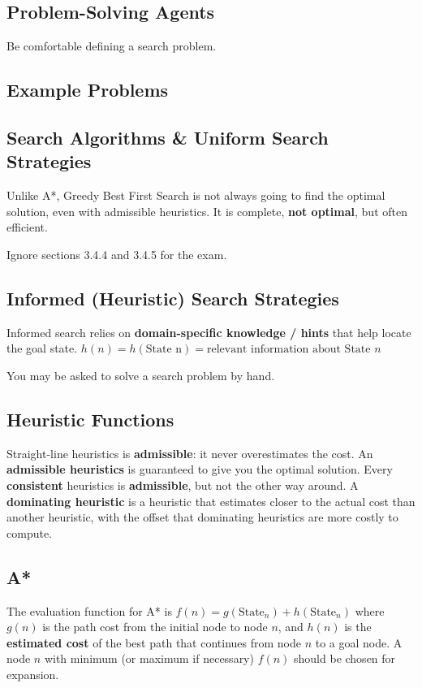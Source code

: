 \documentclass[exam={Midterm},color=true]{cs581exam}
\renewcommand{\emph}[1]{\textbf{#1}}
\begin{document}
\subsection{Problem-Solving Agents}\label{subsec:3.1}
Be comfortable defining a search problem.
\subsection{Example Problems}\label{subsec:3.2}
\subsection{Search Algorithms \& Uniform Search Strategies}\label{subsec:3.3-4}
Unlike A*, Greedy Best First Search is not always going to find the optimal solution, even with admissible heuristics.
It is complete, \emph{not optimal}, but often efficient.

Ignore sections 3.4.4 and 3.4.5 for the exam.
\setcounter{subsection}{4}%
\subsection{Informed (Heuristic) Search Strategies}\label{subsec:3.5}
Informed search relies on \emph{domain-specific knowledge / hints} that help locate the goal state.
$h(n)=h(\mbox{State n})=\mbox{relevant information about State } n$

You may be asked to solve a search problem by hand.
\subsection{Heuristic Functions}\label{subsec:3.6}
Straight-line heuristics is \emph{admissible}: it never overestimates the cost.
An \emph{admissible heuristics} is guaranteed to give you the optimal solution.
Every \emph{consistent} heuristics is \emph{admissible}, but not the other way around.
A \emph{dominating heuristic} is a heuristic that estimates closer to the actual cost than another heuristic,
with the offset that dominating heuristics are more costly to compute.

\subsection{A*}\label{subsec:a*}
The evaluation function for A* is $f(n) = g(\mbox{State}_{n}) + h(\mbox{State}_{n})$ where $g(n)$ is the path cost from the initial node to node $n$,
and $h(n)$ is the \emph{estimated cost} of the best path that continues from node $n$ to a goal node.
A node $n$ with minimum (or maximum if necessary) $f(n)$ should be chosen for expansion.
\end{document}

